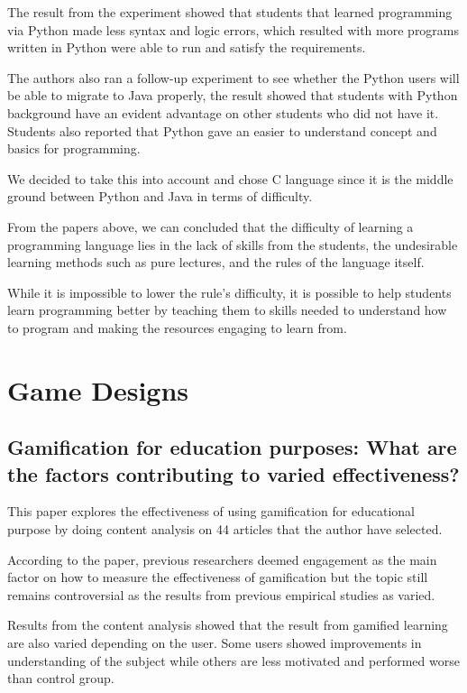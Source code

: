 The result from the experiment showed that students that learned programming via Python made less syntax and logic errors, which resulted with more programs written in Python were able to run and satisfy the requirements. 

The authors also ran a follow-up experiment to see whether the Python users will be able to migrate to Java properly, the result showed that students with Python background have an evident advantage on other students who did not have it. Students also reported that Python gave an easier to understand concept and basics for programming.

We decided to take this into account and chose C language since it is the middle ground between Python and Java in terms of difficulty.\newline

\noindent\hspace{1.5em}
From the papers above, we can concluded that the difficulty of learning a programming language lies in the lack of skills from the students, the undesirable learning methods such as pure lectures, and the rules of the language itself.

\noindent\hspace{1.5em}
While it is impossible to lower the rule's difficulty, it is possible to help students learn programming better by teaching them to skills needed to understand how to program and making the resources engaging to learn from.

\section{Game Designs}
\subsection{Gamification for education purposes: What are the factors contributing to varied effectiveness? \cite{EffectFactor}}
This paper explores the effectiveness of using gamification for educational purpose by doing content analysis on 44 articles that the author have selected.

According to the paper, previous researchers deemed engagement as the main factor on how to measure the effectiveness of gamification but the topic still remains controversial as the results from previous empirical studies as varied.

Results from the content analysis showed that the result from gamified learning are also varied depending on the user. Some users showed improvements in understanding of the subject while others are less motivated and performed worse than control group.


